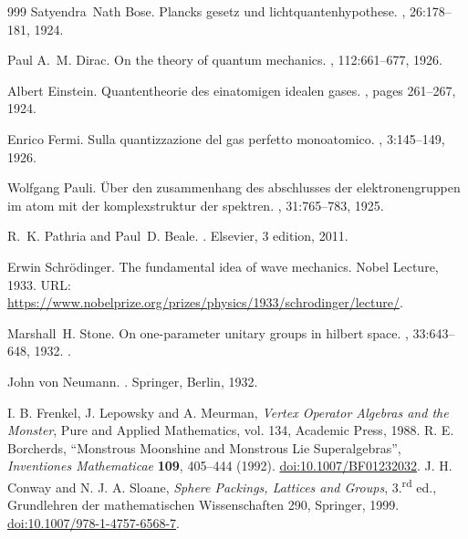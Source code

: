 \begin{thebibliography}{999}
Satyendra~Nath Bose.
\newblock Plancks gesetz und lichtquantenhypothese.
, 26:178--181, 1924.

Paul A.~M. Dirac.
\newblock On the theory of quantum mechanics.
, 112:661--677, 1926.

Albert Einstein.
\newblock Quantentheorie des einatomigen idealen gases.
,
  pages 261--267, 1924.

Enrico Fermi.
\newblock Sulla quantizzazione del gas perfetto monoatomico.
, 3:145--149, 1926.

Wolfgang Pauli.
\newblock Über den zusammenhang des abschlusses der elektronengruppen im atom
  mit der komplexstruktur der spektren.
, 31:765--783, 1925.

R.~K. Pathria and Paul~D. Beale.
.
\newblock Elsevier, 3 edition, 2011.

Erwin Schrödinger.
\newblock The fundamental idea of wave mechanics.
\newblock Nobel Lecture, 1933.
\newblock URL:
  \url{https://www.nobelprize.org/prizes/physics/1933/schrodinger/lecture/}.

Marshall~H. Stone.
\newblock On one-parameter unitary groups in hilbert space.
, 33:643--648, 1932.
\newblock \href {https://doi.org/10.2307/1968538} {}.

John von Neumann.
.
\newblock Springer, Berlin, 1932.

 I. B. Frenkel, J. Lepowsky and A. Meurman, \emph{Vertex Operator Algebras and the Monster}, Pure and Applied Mathematics, vol. 134, Academic Press, 1988.
 R. E. Borcherds, ``Monstrous Moonshine and Monstrous Lie Superalgebras'', \emph{Inventiones Mathematicae} \textbf{109}, 405--444 (1992). \href{https://doi.org/10.1007/BF01232032}{doi:10.1007/BF01232032}.
 J. H. Conway and N. J. A. Sloane, \emph{Sphere Packings, Lattices and Groups}, 3.\textsuperscript{rd} ed., Grundlehren der mathematischen Wissenschaften 290, Springer, 1999. \href{https://doi.org/10.1007/978-1-4757-6568-7}{doi:10.1007/978-1-4757-6568-7}.



\end{thebibliography}
